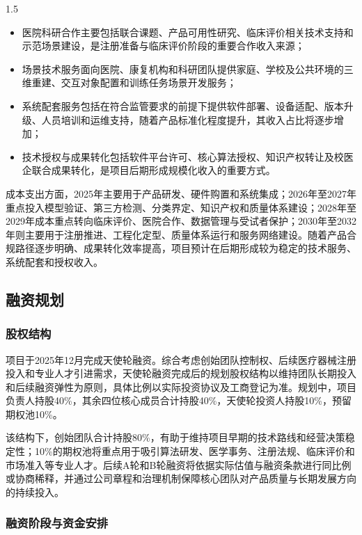 \documentclass[zihao=-4]{ctexart}
\begin{document}
\begin{spacing}{1.5}
\begin{itemize}[leftmargin=2em]
  \item 医院科研合作主要包括联合课题、产品可用性研究、临床评价相关技术支持和示范场景建设，是注册准备与临床评价阶段的重要合作收入来源；
  \item 场景技术服务面向医院、康复机构和科研团队提供家庭、学校及公共环境的三维重建、交互对象配置和训练任务场景开发服务；
  \item 系统配套服务包括在符合监管要求的前提下提供软件部署、设备适配、版本升级、人员培训和运维支持，随着产品标准化程度提升，其收入占比将逐步增加；
  \item 技术授权与成果转化包括软件平台许可、核心算法授权、知识产权转让及校医企联合成果转化，是项目后期形成规模化收入的重要方式。
\end{itemize}

成本支出方面，2025年主要用于产品研发、硬件购置和系统集成；2026年至2027年重点投入模型验证、第三方检测、分类界定、知识产权和质量体系建设；2028年至2029年成本重点转向临床评价、医院合作、数据管理与受试者保护；2030年至2032年则主要用于注册推进、工程化定型、质量体系运行和服务网络建设。随着产品合规路径逐步明确、成果转化效率提高，项目预计在后期形成较为稳定的技术服务、系统配套和授权收入。

\subsection{融资规划}

\subsubsection{股权结构}

项目于2025年12月完成天使轮融资。综合考虑创始团队控制权、后续医疗器械注册投入和专业人才引进需求，天使轮融资完成后的规划股权结构以维持团队长期投入和后续融资弹性为原则，具体比例以实际投资协议及工商登记为准。规划中，项目负责人持股40\%，其余四位核心成员合计持股40\%，天使轮投资人持股10\%，预留期权池10\%。

该结构下，创始团队合计持股80\%，有助于维持项目早期的技术路线和经营决策稳定性；10\%的期权池将重点用于吸引算法研发、医学事务、注册法规、临床评价和市场准入等专业人才。后续A轮和B轮融资将依据实际估值与融资条款进行同比例或协商稀释，并通过公司章程和治理机制保障核心团队对产品质量与长期发展方向的持续投入。

\subsubsection{融资阶段与资金安排}


\end{spacing}
\end{document}
